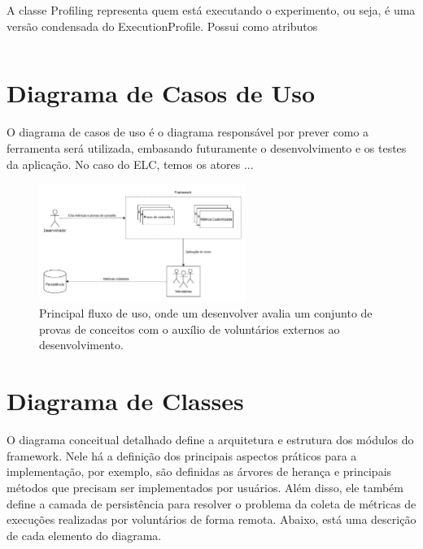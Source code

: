 \documentclass[12pt]{tcc}
\begin{document}
A classe Profiling representa quem está executando o experimento, ou seja, é uma versão condensada do ExecutionProfile. Possui como atributos 

\begin{lstlisting}[label={lst:sheetson_class}, caption={Implementação da classe responsável pela persistência dos dados usando o Sheetson.}, language=TypeScript, breaklines=true]

\end{lstlisting}





\section{Diagrama de Casos de Uso}
\label{sec:diagrama_de_caso_de_uso}

O diagrama de casos de uso é o diagrama responsável por prever como a ferramenta será utilizada, embasando futuramente o desenvolvimento e os testes da aplicação. No caso do ELC, temos os atores ...

\begin{figure}[!ht]
	\centering
	\includegraphics[width=0.6\textwidth]{figures/diagrama-informal.pdf}
	\caption{Principal fluxo de uso, onde um desenvolver avalia um conjunto de provas de conceitos com o auxílio de voluntários externos ao desenvolvimento.}
	\label{fig:diagrama-informal}
\end{figure}

	
\section{Diagrama de Classes}
\label{cap:diagrama_de_classe}


O diagrama conceitual detalhado define a arquitetura e estrutura dos módulos do framework.
Nele há a definição dos principais aspectos práticos para a implementação, por exemplo, são definidas as árvores de herança e principais métodos que precisam ser implementados por usuários.
Além disso, ele também define a camada de persistência para resolver o problema da coleta de métricas de execuções realizadas por voluntários de forma remota.
Abaixo, está uma descrição de cada elemento do diagrama.
\end{document}
